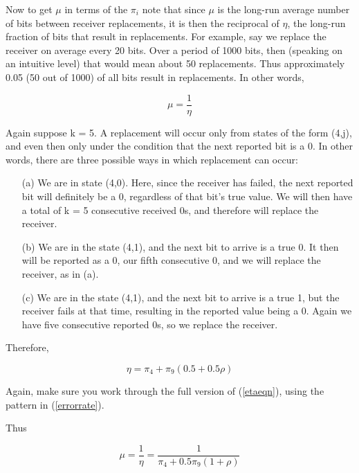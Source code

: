 Now to get $\mu$ in terms of the $\pi_{i}$ note that since $\mu$ is the
long-run average number of bits between receiver replacements, it is
then the reciprocal of $\eta$, the long-run fraction of bits that result
in replacements. For example, say we replace the receiver on average
every 20 bits.  Over a period of 1000 bits, then (speaking on an
intuitive level) that would mean about 50 replacements.  Thus
approximately 0.05 (50 out of 1000) of all bits result in replacements.
In other words,

\begin{equation}
\mu = \frac{1}{\eta}
\end{equation}

Again suppose k = 5. A replacement will occur only from states of the
form (4,j), and even then only under the condition that the next
reported bit is a 0. In other words, there are three possible ways in
which replacement can occur:

\begin{itemize}

\item [(a)] We are in state (4,0). Here, since the receiver has failed,
the next reported bit will definitely be a 0, regardless of that bit's
true value. We will then have a total of k = 5 consecutive received 0s,
and therefore will replace the receiver. 

\item [(b)] We are in the state (4,1), and the next bit to arrive is a
true 0. It then will be reported as a 0, our fifth consecutive 0, and we
will replace the receiver, as in (a). 

\item [(c)] We are in the state (4,1), and the next bit to arrive is a
true 1, but the receiver fails at that time, resulting in the reported
value being a 0. Again we have five consecutive reported 0s, so we
replace the receiver. 

\end{itemize}

Therefore,

\begin{equation}
\label{etaeqn}
\eta = \pi_{4}+\pi_{9}(0.5+0.5\rho )
\end{equation}

Again, make sure you work through the full version of (\ref{etaeqn}),
using the pattern in (\ref{errorrate}).

Thus

\begin{equation}
\mu =\frac{1}{\eta} = \frac{1}{\pi_{4}+0.5\pi_{9}(1+\rho )}
\end{equation}


